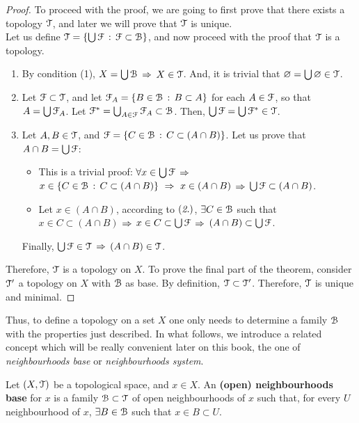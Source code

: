 \begin{proof}
	To proceed with the proof, we are going to first prove that there exists a topology $\EuScript{T}$, and later
	we will prove that $\EuScript{T}$ is unique.\\
	Let us define $\EuScript{T} = \{\bigcup \EuScript{F}\,:\,\EuScript{F}\subset \EuScript{B}\}$, and now proceed with the proof
	that $\EuScript{T}$ is a topology.
	\begin{enumerate}
		\item By condition (1), $X=\bigcup \EuScript{B}$ $\Rightarrow$ $X\in \EuScript{T}$.
		And, it is trivial that $\varnothing = \bigcup \varnothing \in \EuScript{T}$.

		\item Let $\EuScript{F}\subset \EuScript{T}$, and let $\EuScript{F}_A=\{B\in \EuScript{B}\,:\, B\subset A\}$ for each
		$A\in\EuScript{F}$, so that $A=\bigcup\EuScript{F}_A$.
		Let $\EuScript{F}^*=\bigcup_{A\in\EuScript{F}}\EuScript{F}_A\subset\EuScript{B}$.
		Then,  $\bigcup \EuScript{F} =\bigcup\EuScript{F}^*\in\EuScript{T}$.

		\item Let $A, B\in \EuScript{T}$, and $\EuScript{F} = \{C\in\EuScript{B}\,:\, C \subset(A\cap B)\}$.
		Let us prove that $A\cap B = \bigcup\EuScript{F}$:
		\begin{itemize}
			\item[\boxed{\supseteq}] This is a trivial proof: $\forall x\in\bigcup\EuScript{F}$ $\Rightarrow$
			$x\in\left\{C\in\EuScript{B}\,:\,C\subset(A\cap B)\right\}\ \Rightarrow\ x\in (A\cap B)$ $\Rightarrow$
			$\bigcup\EuScript{F} \subset (A\cap B)$.
			\item[\boxed{\subseteq}] Let $x\in (A\cap B)$, according to $(\emph{2.})$,
			$\exists C\in \EuScript{B}$ such that $x\in C\subset (A\cap B)$ $\Rightarrow$ $x\in C\subset
			\bigcup\EuScript{F}$ $\Rightarrow$ $(A\cap B)\subset \bigcup\EuScript{F}$.
		\end{itemize}
		Finally, $\bigcup \EuScript{F}\in \EuScript{T}$ $\Rightarrow$ $(A\cap B) \in \EuScript{T}$.
	\end{enumerate}
	Therefore, $\EuScript{T}$ is a topology on $X$.
	To prove the final part of the theorem, consider $\EuScript{T}'$ a topology on $X$ with
	$\EuScript{B}$ as base.
	By definition, $\EuScript{T}\subset \EuScript{T}'$.
	Therefore, $\EuScript{T}$ is unique and minimal.
\end{proof}

Thus, to define a topology on a set $X$ one only needs to determine a family $\EuScript{B}$ with
the properties just described.
In what follows, we introduce a related concept which
will be really convenient later on this book, the one of \emph{neighbourhoods base} or
\emph{neighbourhoods system}.

\begin{definition}
	\label{def:neighbourhoods-base}
	Let $(X, \EuScript{T})$ be a topological space, and $x\in X$.
	An \textbf{(open) neighbourhoods base} for $x$ is a family $\EuScript{B}\subset\EuScript{T}$ of open
	neighbourhoods of $x$ such that, for every $U$ neighbourhood of $x$, $\exists B\in\EuScript{B}$ such that
	$x\in B\subset U$.
\end{definition}

